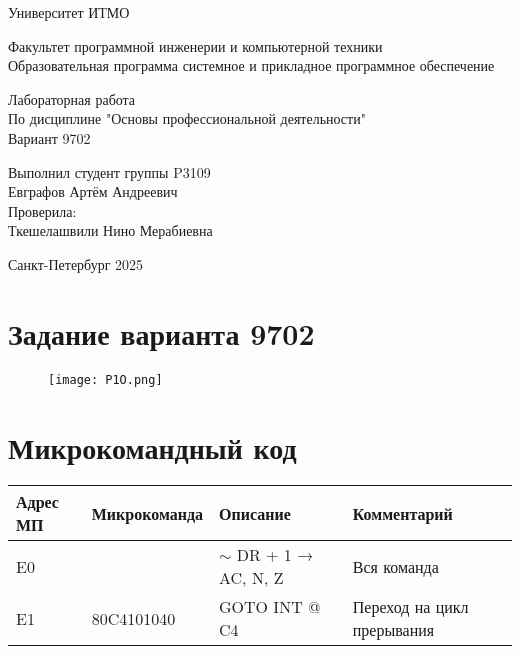

\thispagestyle{empty}
\begin{center}
\LARGE{Университет ИТМО} 
\vspace{20pt}

\LARGE{Факультет программной инженерии и компьютерной техники \\
Образовательная программа системное и прикладное программное обеспечение}
\vspace{160pt}

\LARGE{Лабораторная работа   \\
По дисциплине "Основы профессиональной деятельности" \\ 
Вариант 9702}
\vspace{120pt}
\end{center}

\begin{flushright}
\LARGE{Выполнил студент группы P3109 \\ 
Евграфов Артём Андреевич \\
Проверила: \\
Ткешелашвили Нино Мерабиевна}
\vspace{120pt}
\end{flushright}

\begin{center}
\Large{Санкт-Петербург 2025}
\end{center}

\newpage
\setcounter{page}{1}
\tableofcontents
\newpage
\section{Задание варианта 9702}
\begin{figure}[H]
    \centering
\texttt{[image: P1O.png]}
\end{figure}
\section{Микрокомандный код}
\begin{longtable}{|>{\centering\arraybackslash}p{1cm}|>{\centering\arraybackslash}p{2.5cm}|>{\centering\arraybackslash}p{3cm}|>{\arraybackslash}p{9cm}|}
\hline
Адрес МП & Микрокоманда & Описание & Комментарий \\
\hline
\endfirsthead

\hline
\endlastfoot
E0 & 0010809501 & $\sim$ DR + 1 → AC, N, Z & Вся команда  \\\hline
E1 & 80C4101040 & GOTO INT @ C4 & Переход на цикл прерывания \\\hline
\end{longtable}
